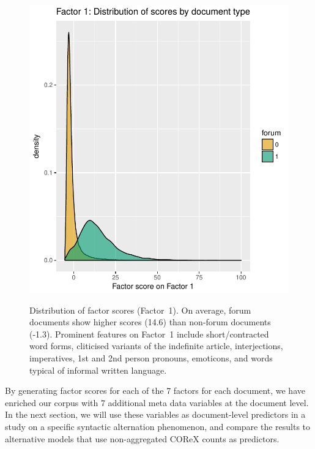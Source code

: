 \begin{figure}
   \includegraphics[scale=.95]{../R/forum-factor1.pdf}
   \label{forum-factor1}
  \caption{Distribution of factor scores (Factor~1). On average, forum documents show higher scores (14.6) than non-forum documents (-1.3). Prominent features on Factor~1 include short/contracted word forms, cliticised variants of the indefinite article, interjections, imperatives, 1st and 2nd person pronouns, emoticons, and words typical of informal written language.}  
\end{figure}

By generating factor scores for each of the 7 factors for each document, we have enriched our corpus with 7 additional meta data variables at the document level.
In the next section, we will use these variables as document-level predictors in a study on a specific syntactic alternation phenomenon, and compare the results to alternative models that use non-aggregated COReX counts as predictors.





